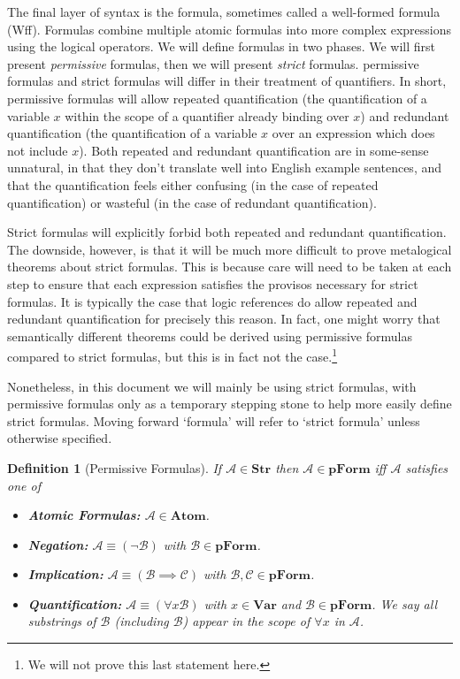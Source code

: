 \documentclass[12pt]{article}
\theoremstyle{break}
\newtheorem{definition}{Definition}[section]
\theoremstyle{break}
\theoremstyle{break}
\theoremstyle{break}
\theoremstyle{break}
\newtheorem{informal definition}[definition]{Informal Definition}
\newcommand{\mc}[1]{\mathcal{#1}}
\begin{document}
The final layer of syntax is the formula, sometimes called a well-formed formula  (Wff).
Formulas combine multiple atomic formulas into more complex expressions using the logical operators.
We will define formulas in two phases.
We will first present \textit{permissive} formulas, then we will present \textit{strict} formulas.
permissive formulas and strict formulas will differ in their treatment of quantifiers.
In short, permissive formulas will allow repeated quantification (the quantification of a variable $x$ within the scope of a quantifier already binding over $x$) and redundant quantification (the quantification of a variable $x$ over an expression which does not include $x$).
Both repeated and redundant quantification are in some-sense unnatural, in that they don't translate well into English example sentences, and that the quantification feels either confusing (in the case of repeated quantification) or wasteful (in the case of redundant quantification).

Strict formulas will explicitly forbid both repeated and redundant quantification.
The downside, however, is that it will be much more difficult to prove metalogical theorems about strict formulas.
This is because care will need to be taken at each step to ensure that each expression satisfies the provisos necessary for strict formulas.
It is typically the case that logic references do allow repeated and redundant quantification for precisely this reason.
In fact, one might worry that semantically different theorems could be derived using permissive formulas compared to strict formulas, but this is in fact not the case.\footnote{We will not prove this last statement here.}

Nonetheless, in this document we will mainly be using strict formulas, with permissive formulas only as a temporary stepping stone to help more easily define strict formulas.
Moving forward `formula' will refer to `strict formula' unless otherwise specified.

\begin{definition}[Permissive Formulas]
If $\mc{A}\in\textbf{Str}$ then $\mc{A}\in\textbf{pForm}$ iff $\mc{A}$ satisfies one of

\begin{itemize}
\item{\textbf{Atomic Formulas:} $\mc{A}\in\textbf{Atom}$.}
\item{\textbf{Negation:} $\mc{A}\equiv (\lnot \mc{B})$ with $\mc{B} \in \textbf{pForm}$.}
\item{\textbf{Implication:} $\mc{A}\equiv (\mc{B}\implies \mc{C})$ with $\mc{B}, \mc{C} \in \textbf{pForm}$.}
\item{\textbf{Quantification:} $\mc{A}\equiv (\forall x \mc{B})$ with $x\in \textbf{Var}$ and $\mc{B}\in \textbf{pForm}$. We say all substrings of $\mc{B}$ (including $\mc{B}$) appear in the scope of $\forall x$ in $\mc{A}$.}
\end{itemize}
\end{definition}
\end{document}
